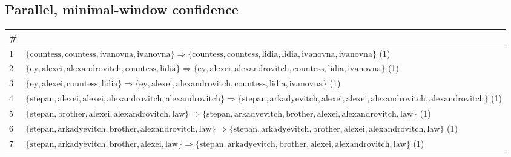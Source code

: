 \begin{appendices}
\section{Parallel, minimal-window confidence}

\begin{longtable}{p{20pt}|p{\dimexpr\textwidth-20pt-\tabcolsep\relax}}
\# & \\
\hline
1 & $ \{ \text{countess},\allowbreak\text{countess},\allowbreak\text{ivanovna},\allowbreak\text{ivanovna} \} \Rightarrow \{ \text{countess},\allowbreak\text{countess},\allowbreak\text{lidia},\allowbreak\text{lidia},\allowbreak\text{ivanovna},\allowbreak\text{ivanovna} \} $ (1) \\
2 & $ \{ \text{ey},\allowbreak\text{alexei},\allowbreak\text{alexandrovitch},\allowbreak\text{countess},\allowbreak\text{lidia} \} \Rightarrow \{ \text{ey},\allowbreak\text{alexei},\allowbreak\text{alexandrovitch},\allowbreak\text{countess},\allowbreak\text{lidia},\allowbreak\text{ivanovna} \} $ (1) \\
3 & $ \{ \text{ey},\allowbreak\text{alexei},\allowbreak\text{countess},\allowbreak\text{lidia} \} \Rightarrow \{ \text{ey},\allowbreak\text{alexei},\allowbreak\text{alexandrovitch},\allowbreak\text{countess},\allowbreak\text{lidia},\allowbreak\text{ivanovna} \} $ (1) \\
4 & $ \{ \text{stepan},\allowbreak\text{alexei},\allowbreak\text{alexei},\allowbreak\text{alexandrovitch},\allowbreak\text{alexandrovitch} \} \Rightarrow \{ \text{stepan},\allowbreak\text{arkadyevitch},\allowbreak\text{alexei},\allowbreak\text{alexei},\allowbreak\text{alexandrovitch},\allowbreak\text{alexandrovitch} \} $ (1) \\
5 & $ \{ \text{stepan},\allowbreak\text{brother},\allowbreak\text{alexei},\allowbreak\text{alexandrovitch},\allowbreak\text{law} \} \Rightarrow \{ \text{stepan},\allowbreak\text{arkadyevitch},\allowbreak\text{brother},\allowbreak\text{alexei},\allowbreak\text{alexandrovitch},\allowbreak\text{law} \} $ (1) \\
6 & $ \{ \text{stepan},\allowbreak\text{arkadyevitch},\allowbreak\text{brother},\allowbreak\text{alexandrovitch},\allowbreak\text{law} \} \Rightarrow \{ \text{stepan},\allowbreak\text{arkadyevitch},\allowbreak\text{brother},\allowbreak\text{alexei},\allowbreak\text{alexandrovitch},\allowbreak\text{law} \} $ (1) \\
7 & $ \{ \text{stepan},\allowbreak\text{arkadyevitch},\allowbreak\text{brother},\allowbreak\text{alexei},\allowbreak\text{law} \} \Rightarrow \{ \text{stepan},\allowbreak\text{arkadyevitch},\allowbreak\text{brother},\allowbreak\text{alexei},\allowbreak\text{alexandrovitch},\allowbreak\text{law} \} $ (1) \\

\end{longtable}
\end{appendices}

